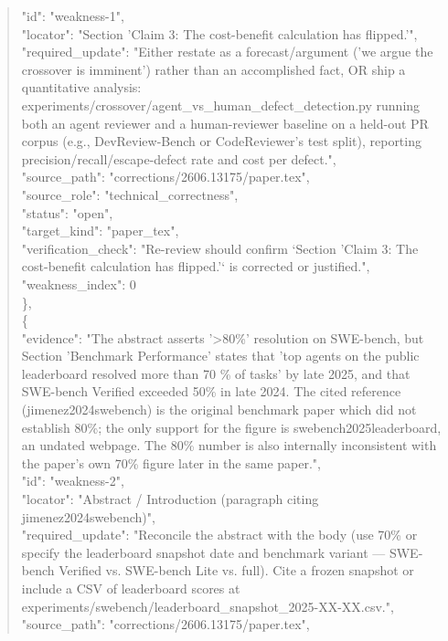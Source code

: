 \documentclass[11pt]{article}
\begin{document}
\begin{quote}
      "id": "weakness-1",\\
      "locator": "Section 'Claim 3: The cost-benefit calculation has flipped.'",\\
      "required\_update": "Either restate as a forecast/argument ('we argue the crossover is imminent') rather than an accomplished fact, OR ship a quantitative analysis: experiments/crossover/agent\_vs\_human\_defect\_detection.py running both an agent reviewer and a human-reviewer baseline on a held-out PR corpus (e.g., DevReview-Bench or CodeReviewer's test split), reporting precision/recall/escape-defect rate and cost per defect.",\\
      "source\_path": "corrections/2606.13175/paper.tex",\\
      "source\_role": "technical\_correctness",\\
      "status": "open",\\
      "target\_kind": "paper\_tex",\\
      "verification\_check": "Re-review should confirm `Section 'Claim 3: The cost-benefit calculation has flipped.'` is corrected or justified.",\\
      "weakness\_index": 0\\
    \},\\
    \{\\
      "evidence": "The abstract asserts '>80\%' resolution on SWE-bench, but Section 'Benchmark Performance' states that 'top agents on the public leaderboard resolved more than 70 \% of tasks' by late 2025, and that SWE-bench Verified exceeded 50\% in late 2024. The cited reference (jimenez2024swebench) is the original benchmark paper which did not establish 80\%; the only support for the figure is swebench2025leaderboard, an undated webpage. The 80\% number is also internally inconsistent with the paper's own 70\% figure later in the same paper.",\\
      "id": "weakness-2",\\
      "locator": "Abstract / Introduction (paragraph citing jimenez2024swebench)",\\
      "required\_update": "Reconcile the abstract with the body (use 70\% or specify the leaderboard snapshot date and benchmark variant --- SWE-bench Verified vs. SWE-bench Lite vs. full). Cite a frozen snapshot or include a CSV of leaderboard scores at experiments/swebench/leaderboard\_snapshot\_2025-XX-XX.csv.",\\
      "source\_path": "corrections/2606.13175/paper.tex",\\

\end{quote}
\end{document}

